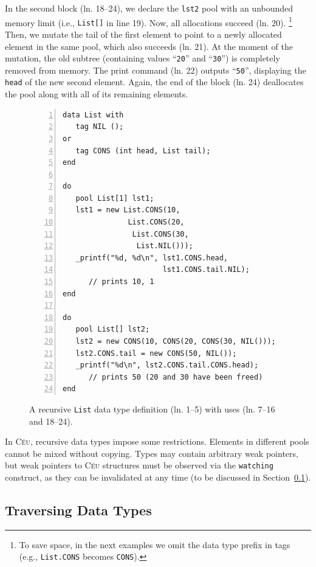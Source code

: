 \documentclass{sig-alternate}
\newcommand{\CEU}{\textsc{C\'{e}u}\xspace}
\newcommand{\code}[1] {{\small{\texttt{#1}}}}
\begin{document}
In the second block (ln. 18--24), we declare the \code{lst2} pool with an 
unbounded memory limit (i.e., \code{List[]} in line 19).
Now, all allocations succeed (ln. 20).%
\footnote{To save space, in the next examples we omit the data type prefix in 
tags (e.g., \code{List.CONS} becomes \code{CONS}).}
Then, we mutate the tail of the first element to point to a newly allocated 
element in the same pool, which also succeeds (ln. 21).
At the moment of the mutation, the old subtree (containing values  
``\texttt{20}'' and  ``\texttt{30}'') is completely removed from memory.
The print command (ln. 22) outputs ``\texttt{50}'', displaying the \code{head}
of the new second element.
%
Again, the end of the block (ln. 24) deallocates the pool along with all of its 
remaining elements.


\begin{figure}[t]
\begin{lstlisting}[numbers=left,xleftmargin=3em]
data List with
   tag NIL ();
or
   tag CONS (int head, List tail);
end

do
   pool List[1] lst1;
   lst1 = new List.CONS(10,
               List.CONS(20,
                List.CONS(30,
                 List.NIL()));
   _printf("%d, %d\n", lst1.CONS.head,
                       lst1.CONS.tail.NIL);
      // prints 10, 1
end

do
   pool List[] lst2;
   lst2 = new CONS(10, CONS(20, CONS(30, NIL()));
   lst2.CONS.tail = new CONS(50, NIL());
   _printf("%d\n", lst2.CONS.tail.CONS.head);
      // prints 50 (20 and 30 have been freed)
end
\end{lstlisting}
\caption{
A recursive \code{List} data type definition (ln. 1--5) with uses (ln. 
7--16 and 18--24).
\label{lst.list}
}
\end{figure}

In \CEU, recursive data types impose some restrictions.
Elements in different pools cannot be mixed without copying.
Types may contain arbitrary weak pointers, but weak pointers to \CEU
structures must be observed via the
\code{watching} construct, as they can be invalidated at any time
(to be discussed in Section~\ref{sec.traverse}).


\subsection{Traversing Data Types}
\label{sec.traverse}
\end{document}

